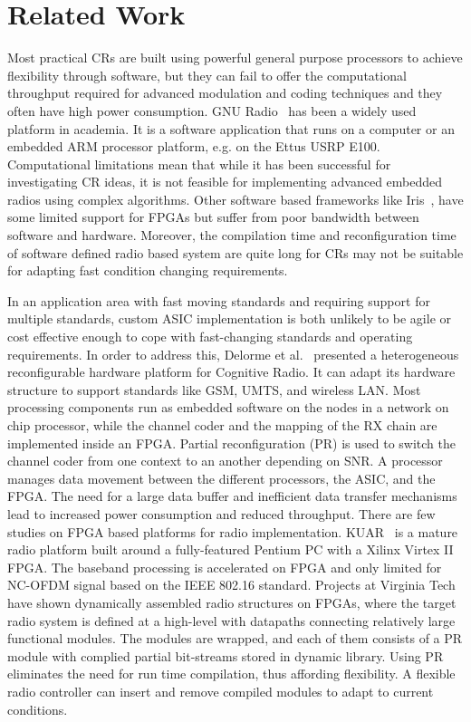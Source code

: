 \section{Related Work}
Most practical CRs are built using powerful general purpose processors to achieve flexibility through software, but they can fail to offer the computational throughput required for advanced modulation and coding techniques and they often have high power consumption.
GNU Radio~\cite{gnuradio} has been a widely used platform in academia. 
It is a software application that runs on a computer or an embedded ARM processor platform, e.g. on the Ettus USRP E100. 
Computational limitations mean that while it has been successful for investigating CR ideas, it is not feasible for implementing advanced embedded radios using complex algorithms.
Other software based frameworks like Iris~\cite{Sutton2010}, have some limited support for FPGAs but suffer from poor bandwidth between software and hardware.
Moreover, the compilation time and reconfiguration time of software defined radio based system are quite long for CRs may not be suitable for adapting fast condition changing requirements.

In an application area with fast moving standards and requiring support for multiple standards, custom ASIC implementation is both unlikely to be agile or cost effective enough to cope with fast-changing standards and operating requirements. 
In order to address this, Delorme et al.~\cite{Delorme2008} presented a heterogeneous reconfigurable hardware platform for Cognitive Radio. 
It can adapt its hardware structure to support standards like GSM, UMTS, and wireless LAN. 
Most processing components run as embedded software on the nodes in a network on chip processor, while the channel coder and the mapping of the RX chain are implemented inside an FPGA. 
Partial reconfiguration (PR) is used to switch the channel coder from one context to an another depending on SNR. 
A processor manages data movement between the different processors, the ASIC, and the FPGA. The need for a large data buffer and inefficient data transfer mechanisms lead to increased power consumption and reduced throughput.
There are few studies on FPGA based platforms for radio implementation. 
KUAR~\cite{Minden2007} is a mature radio platform built around a fully-featured Pentium PC with a Xilinx Virtex II FPGA. 
The baseband processing is accelerated on FPGA and only limited for NC-OFDM signal based on the IEEE 802.16 standard.
Projects at Virginia Tech~\cite{athanaswires} have shown dynamically assembled radio structures on FPGAs, where the target radio system is defined at a high-level with datapaths connecting relatively large functional modules. 
The modules are wrapped, and each of them consists of a PR module with complied partial bit-streams stored in dynamic library. 
Using PR eliminates the need for run time compilation, thus affording flexibility. 
A flexible radio controller can insert and remove compiled modules to adapt to current conditions.


